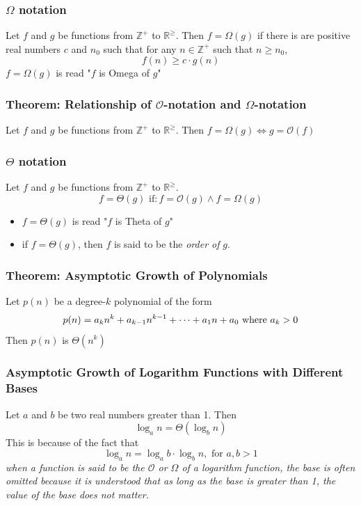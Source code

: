 \subsubsection*{$\Omega$ notation}
Let $f$ and $g$ be functions from $\mathbb{Z}^+$ to $\mathbb{R}^{\geq}$.
Then $f=\Omega(g)$ if there is are positive real numbers $c$ and $n_0$ such that for any $n \in \mathbb{Z}^+$ such that $n \geq n_0$,
\[
  f(n) \geq c \cdot g(n)
\]
$f=\Omega(g)$ is read "$f$ is Omega of $g$"

\subsubsection*{Theorem: Relationship of $\mathcal{O}$-notation and $\Omega$-notation}
Let $f$ and $g$ be functions from $\mathbb{Z}^+$ to $\mathbb{R}^{\geq}$. Then $f=\Omega(g) \iff g = \mathcal{O}(f)$

\subsubsection*{$\Theta$ notation}
Let $f$ and $g$ be functions from $\mathbb{Z}^+$ to $\mathbb{R}^{\geq}$.
\[
  f = \Theta(g) \text{ if}: f = \mathcal{O}(g) \land f = \Omega(g)
\]
\begin{itemize}
  \item $f = \Theta(g)$ is read "$f$ is Theta of $g$"
  \item if $f = \Theta(g)$, then $f$ is said to be the \textit{order of} $g$.
\end{itemize}

\subsubsection*{Theorem: Asymptotic Growth of Polynomials}
Let $p(n)$ be a degree-$k$ polynomial of the form
\[
  p(n) = a_{k}n^{k} + a_{k-1}n^{k-1} + \cdots + a_{1}n + a_0 \text{ where } a_k > 0 \\
\]
Then $p(n)$ is $\Theta(n^k)$

\subsubsection*{Asymptotic Growth of Logarithm Functions with Different Bases}
Let $a$ and $b$ be two real numbers greater than 1. Then
\[
  \log_{a}n = \Theta(\log_{b}n)
\]
This is because of the fact that
\[
  \log_{a}n = \log_{a}b \cdot \log_{b}n, \text{ for } a,b > 1
\]
\textit{
  when a function is said to be the $\mathcal{O}$ or $\Omega$ of a logarithm function,
  the base is often omitted because it is understood that as long as the base is greater than 1,
  the value of the base does not matter.
}


